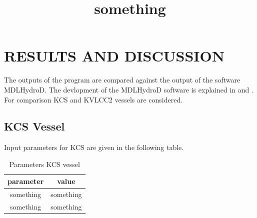 \chapter{RESULTS AND DISCUSSION}
The outputs of the program are compared against the output of the software MDLHydroD. The devlopment of the 
MDLHydroD software is explained in \cite{guha2013development} and \cite{guha2015estimation}.
For comparison KCS and KVLCC2 vessels are considered. 

\section{KCS Vessel}
Input parameters for KCS are given in the following table.
\begin{table}[H]
    \centering
    \begin{tabular}{|c|c|}
        \hline
        parameter & value \\ 
        \hline
        \title{something}
        something & something \\
        something & something \\
        \hline
    \end{tabular}
    \caption{Parameters KCS vessel}
    \label{tab:kcs_inp}
\end{table}

